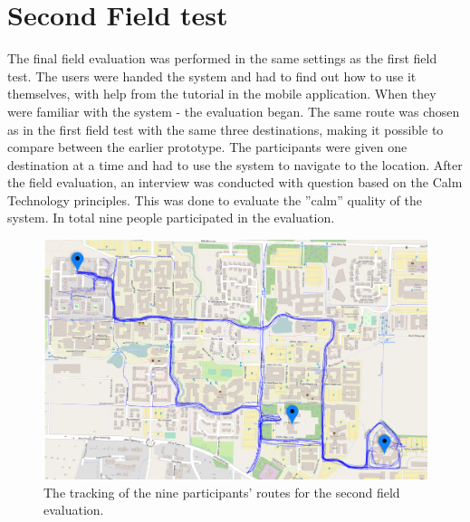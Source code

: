 \documentclass{sigchi}
\begin{document}
\section{Second Field test}
The final field evaluation was performed in the same settings as the first field test. The users were handed the system and had to  find out how to use it themselves, with help from the tutorial in the mobile application. When they were familiar with the system - the evaluation began. The same route was chosen as in the first field test with the same three destinations, making it possible to compare between the earlier prototype. 
\newline
\newline
The participants were given one destination at a time and had to use the system to navigate to the location. After the field evaluation, an interview was conducted with question based on the Calm Technology principles. This was done to evaluate the ''calm'' quality of the system. In total nine people participated in the evaluation.
\begin{figure}[!b]
  \centering
  \includegraphics[width=1.02\columnwidth]{figures/stort_heat_map.png}
  \caption{The tracking of the nine participants' routes for the second field evaluation.}
  \label{fig:stort_heat_map}
\end{figure}
\end{document}
